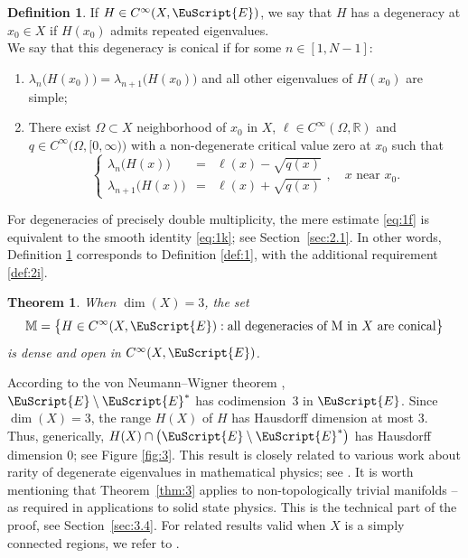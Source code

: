 \documentclass[JEP,XML,SOM,Unicode,NoFloatCountersInSection]{cedram}
\let\pazocal\EuScript
\newenvironment{enumeratei}
{\bgroup\def\theenumi{\roman{enumi}}\def\theenumii{\arabic{enumii}}\begin{enumerate}}
{\end{enumerate}\egroup}
\let\sep:
\newtheorem{theorem}[thm]{Theorem}
\theoremstyle{definition}
\newtheorem{defi}{Definition}
\newcommand{\EE}{\pazocal{E}}
\newcommand{\R}{\mathbb{R}}
\newcommand{\Mm}{\mathbb{M}}
\newcommand{\systeme}[1]{\left\{ \begin{matrix} #1 \end{matrix}\right.}
\begin{document}
\begin{defi}\label{def:2} If $H \in C^\infty(X,\EE)$, we say that $H$ has a degeneracy at $x_0 \in X$ if $H(x_0)$ admits repeated eigenvalues.\\
\indent We say that this degeneracy is conical if for some $n \in [1,N-1]$:
\begin{enumeratei}
\item\label{def:2i}
$\lambda_n\bigl( H(x_0) \bigr) = \lambda_{n+1}\bigl( H(x_0) \bigr)$ and all other eigenvalues of $H(x_0)$ are simple;
\item\label{def:2ii}
There exist $\Omega \subset X$ neighborhood of $x_0$ in $X$, $\ell \in C^\infty(\Omega,\R)$ and $q \in C^\infty\bigl(\Omega,[0,\infty)\bigr)$ with a non-degenerate critical value zero at $x_0$ such that
\begin{equation}\label{eq:1k}
\systeme{
\lambda_n\bigl(H(x)\bigr) & = & \ell(x) - \sqrt{q(x)}
\\[5pt]
\lambda_{n+1}\bigl(H(x)\bigr) & = & \ell(x) + \sqrt{q(x)}}, \quad x \text{ near } x_0.
\end{equation}
\end{enumeratei}
\end{defi}

For degeneracies of precisely double multiplicity, the mere estimate \eqref{eq:1f} is equivalent to the smooth identity \eqref{eq:1k}; see Section~\ref{sec:2.1}. In other words, Definition \ref{def:2} corresponds to Definition \ref{def:1}, with the additional requirement \eqref{def:2i}.

\begin{theorem}\label{thm:2} When $\dim(X) = 3$, the set
\begin{equation}\label{eq:1o}
\Mm = \bigl\{ H \in C^\infty(X,\EE) \sep \text{all degeneracies of M in $X$ are conical} \bigr\}
\end{equation}
is dense and open in $C^\infty(X,\EE)$.
\end{theorem}

According to the von Neumann--Wigner theorem \cite{NW29}, $\EE \setminus \EE^*$ has codimension~$3$ in $\EE$. Since $\dim(X) = 3$, the range $H(X)$ of $H$ has Hausdorff dimension at most $3$. Thus, generically, $H(X) \cap \left( \EE \setminus \EE^*\right)$ has Hausdorff dimension $0$; see Figure \ref{fig:3}. This result is closely related to various work about rarity of degenerate eigenvalues in mathematical physics; see \eg \cite{C91,A95,T99}.
It is worth mentioning that Theorem~\ref{thm:3} applies to non-topologically trivial manifolds -- as required in applications to solid state physics. This is the technical part of the proof, see Section~\ref{sec:3.4}. For related results valid when $X$ is a simply connected regions, we refer to \cite[\S4]{DP12}.
\end{document}
